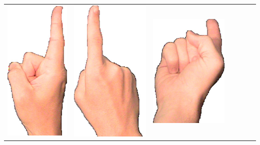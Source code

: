 \documentclass{article}
\begin{document}
\begin{center}
\begin{tabular}{r*{6}{c}}
\includegraphics[scale=0.1]{images/01-01-2.jpg}&
\includegraphics[scale=0.1]{images/01-01-3.jpg}&
\includegraphics[scale=0.1]{images/01-01-4.jpg}&

\end{tabular}
\end{center}
\end{document}
